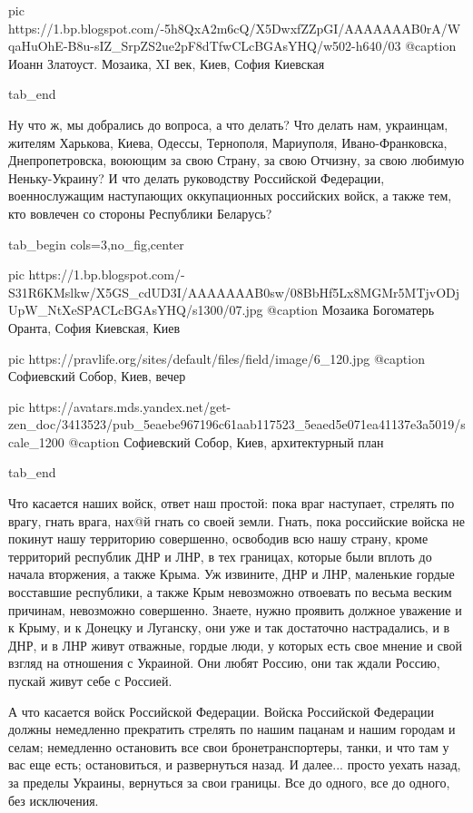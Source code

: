 		 pic https://1.bp.blogspot.com/-5h8QxA2m6cQ/X5DwxfZZpGI/AAAAAAAB0rA/WqaHuOhE-B8u-sIZ_SrpZS2ue2pF8dTfwCLcBGAsYHQ/w502-h640/03%
		 @caption Иоанн Златоуст. Мозаика, XI век, Киев, София Киевская

  tab_end
\fi

Ну что ж, мы добрались до вопроса, а что делать? Что делать нам, украинцам,
жителям Харькова, Киева, Одессы, Тернополя, Мариуполя, Ивано-Франковска,
Днепропетровска, воюющим за свою Страну, за свою Отчизну, за свою любимую
Неньку-Украину? И что делать руководству Российской Федерации, военнослужащим
наступающих оккупационных российских войск, а также тем, кто вовлечен со
стороны Республики Беларусь?

\ifcmt
  tab_begin cols=3,no_fig,center

     pic https://1.bp.blogspot.com/-S31R6KMslkw/X5GS_cdUD3I/AAAAAAAB0sw/08BbHf5Lx8MGMr5MTjvODjUpW_NtXeSPACLcBGAsYHQ/s1300/07.jpg
		 @caption Мозаика Богоматерь Оранта, София Киевская, Киев

		 pic https://pravlife.org/sites/default/files/field/image/6_120.jpg
		 @caption Софиевский Собор, Киев, вечер

		 pic https://avatars.mds.yandex.net/get-zen_doc/3413523/pub_5eaebe967196c61aab117523_5eaed5e071ea41137e3a5019/scale_1200
		 @caption Софиевский Собор, Киев, архитектурный план

  tab_end
\fi

Что касается наших войск, ответ наш простой: пока враг наступает, стрелять по
врагу, гнать врага, нах@й гнать со своей земли. Гнать, пока российские войска
не покинут нашу территорию совершенно, освободив всю нашу страну, кроме
территорий республик ДНР и ЛНР, в тех границах, которые были вплоть до начала
вторжения, а также Крыма. Уж извините, ДНР и ЛНР, маленькие гордые восставшие
республики, а также Крым невозможно отвоевать по весьма веским причинам,
невозможно совершенно. Знаете, нужно проявить должное уважение и к Крыму, и к
Донецку и Луганску, они уже и так достаточно настрадались, и в ДНР, и в ЛНР
живут отважные, гордые люди, у которых есть свое мнение и свой взгляд на
отношения с Украиной. Они любят Россию, они так ждали Россию, пускай живут себе с
Россией.

А что касается войск Российской Федерации. Войска Российской Федерации должны
немедленно прекратить стрелять по нашим пацанам и нашим городам и селам;
немедленно остановить все свои бронетранспортеры, танки, и что там у вас еще
есть; остановиться, и развернуться назад. И далее... просто уехать назад, за
пределы Украины, вернуться за свои границы. Все до одного, все до одного, без
исключения.

